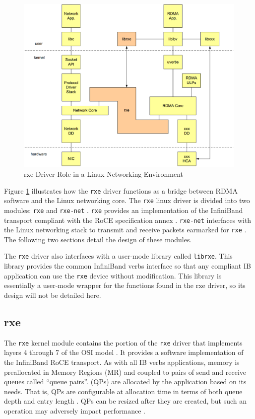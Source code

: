 \documentclass[11pt]{book}
\begin{document}
\begin{figure}
\includegraphics[width=\textwidth]{rxe_linux}
\caption{rxe Driver Role in a Linux Networking Environment \cite{pearson-10}}
\label{rxe-linux}
\end{figure}

Figure \ref{rxe-linux} illustrates how the \verb;rxe; driver functions as a bridge between
RDMA software and the Linux networking core.  The \verb;rxe; linux driver is divided into
two modules: \verb;rxe; and \verb;rxe-net; \cite{pearson-10}.  \verb;rxe; provides an
implementation of the InfiniBand transport compliant with the RoCE specification annex
\cite{InfiniBandTARoCE-10}.  \verb;rxe-net; interfaces with the Linux networking stack to
transmit and receive packets earmarked for \verb;rxe; \cite{pearson-10}.  The following two
sections detail the design of these modules.

The \verb;rxe; driver also interfaces with a user-mode library called \verb;librxe;.  This
library provides the common InfiniBand verbs interface so that any compliant IB
application can use the \verb;rxe; device without modification.  This library is
essentially a user-mode wrapper for the functions found in the rxe driver, so its design
will not be detailed here.

\subsection{rxe}\label{rxe}


The \verb;rxe; kernel module contains the portion of the \verb;rxe; driver that implements
layers 4 through 7 of the OSI model \cite{}.  It provides a software implementation of the
InfiniBand RoCE transport.  As with all IB verbs applications, memory is preallocated in
Memory Regions (MR) and coupled to pairs of send and receive queues called ``queue
pairs''.  (QPs) are allocated by the application based on its needs.  That is, QPs are
configurable at allocation time in terms of both queue depth and entry length
\cite{InfiniBandTARoCE-10,InfiniBandTABase-07}.  QPs can be resized after they are
created, but such an operation may adversely impact performance
\cite{InfiniBandTARoCE-10}.
\end{document}
